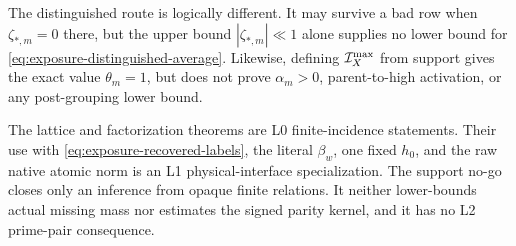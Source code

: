 The distinguished route is logically different.  It may survive a bad row
when \(\zeta_{*,m}=0\) there, but the upper bound
\(|\zeta_{*,m}|\ll1\) alone supplies no lower bound for
\eqref{eq:exposure-distinguished-average}.  Likewise, defining
\(\mathcal I_X^{\max}\) from support gives the exact value \(\theta_m=1\), but
does not prove \(\alpha_m>0\), parent-to-high activation, or any
post-grouping lower bound.

The lattice and factorization theorems are L0 finite-incidence statements.
Their use with \eqref{eq:exposure-recovered-labels}, the literal
\(\beta_w\), one fixed \(h_0\), and the raw native atomic norm is an L1
physical-interface specialization.  The support no-go closes only an
inference from opaque finite relations.  It neither lower-bounds actual
missing mass nor estimates the signed parity kernel, and it has no L2
prime-pair consequence.
